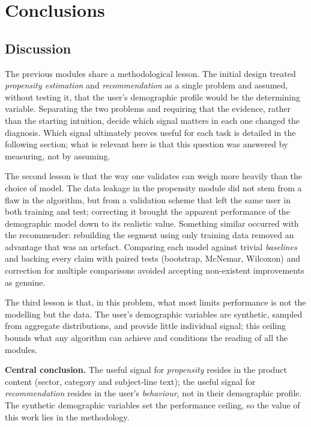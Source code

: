 \chapter{Conclusions}
\label{cap:conclusiones}

\section{Discussion}

The previous modules share a methodological lesson. The initial design treated \emph{propensity estimation} and \emph{recommendation} as a single problem and assumed, without testing it, that the user's demographic profile would be the determining variable. Separating the two problems and requiring that the evidence, rather than the starting intuition, decide which signal matters in each one changed the diagnosis. Which signal ultimately proves useful for each task is detailed in the following section; what is relevant here is that this question was answered by measuring, not by assuming.

The second lesson is that the way one validates can weigh more heavily than the choice of model. The data leakage in the propensity module did not stem from a flaw in the algorithm, but from a validation scheme that left the same user in both training and test; correcting it brought the apparent performance of the demographic model down to its realistic value. Something similar occurred with the recommender: rebuilding the segment using only training data removed an advantage that was an artefact. Comparing each model against trivial \textit{baselines} and backing every claim with paired tests (bootstrap, McNemar, Wilcoxon) and correction for multiple comparisons avoided accepting non-existent improvements as genuine.

The third lesson is that, in this problem, what most limits performance is not the modelling but the data. The user's demographic variables are synthetic, sampled from aggregate distributions, and provide little individual signal; this ceiling bounds what any algorithm can achieve and conditions the reading of all the modules.

\begin{hallazgo}
\textbf{Central conclusion.} The useful signal for \emph{propensity} resides in the product content
(sector, category and subject-line text); the useful signal for \emph{recommendation} resides in the user's
\emph{behaviour}, not in their demographic profile. The synthetic demographic variables set the performance
ceiling, so the value of this work lies in the methodology.
\end{hallazgo}

